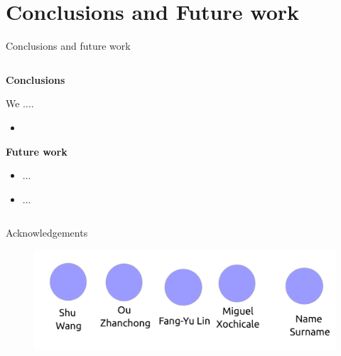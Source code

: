 \section{Conclusions and Future work}

{
\begin{frame}{Conclusions and future work}

  \begin{columns}
  \begin{column}{.75\linewidth}

  \textbf{Conclusions}   

  We ....
  \begin{itemize}
    \item
  \end{itemize}

  \textbf{Future work}
  \begin{itemize}
    \item ...
    \item ...
  \end{itemize}

    \end{column}


  \begin{column}{.3\linewidth}

      \begin{figure}
        \centering
      \end{figure}

    \end{column}
  \end{columns}

\end{frame}
}


{
\begin{frame}{Acknowledgements}

  \begin{figure}
  \centering
  \includegraphics[width=1.0\textwidth]{./figures/team/versions/drawing-v01.png}
  \end{figure}

\end{frame}
}

